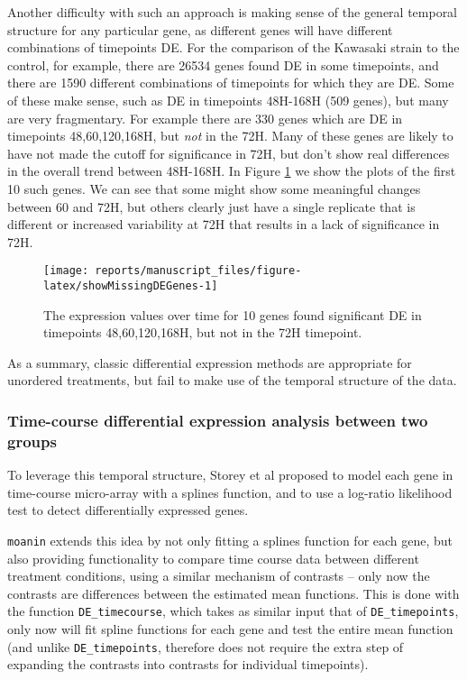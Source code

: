 \documentclass[9pt,a4paper,]{extarticle}
\begin{document}
Another difficulty with such an approach is making sense of the general
temporal structure for any particular gene, as different genes will have
different combinations of timepoints DE. For the comparison of the Kawasaki
strain to the control, for example, there are 26534 genes
found DE in some timepoints, and there are 1590 different
combinations of timepoints for which they are DE. Some of these make sense,
such as DE in timepoints 48H-168H (509 genes), but
many are very fragmentary. For example there are 330
genes which are DE in timepoints 48,60,120,168H, but \emph{not} in the 72H. Many of
these genes are likely to have not made the cutoff for significance in 72H,
but don't show real differences in the overall trend between 48H-168H. In Figure \ref{fig:showMissingDEGenes} we show the plots of the first 10 such genes. We can see that some might
show some meaningful changes between 60 and 72H, but others clearly just have
a single replicate that is different or increased variability at 72H that results in a lack of significance in 72H.

\begin{figure}[H]

{\centering \texttt{[image: reports/manuscript\_files/figure-latex/showMissingDEGenes-1]} 

}

\caption{The expression values over time for 10 genes found significant DE in timepoints 48,60,120,168H, but not in the 72H timepoint.}\label{fig:showMissingDEGenes}
\end{figure}

As a summary, classic differential expression methods are appropriate for
unordered treatments, but fail to make use of the temporal structure of the data.

\hypertarget{time-course-differential-expression-analysis-between-two-groups}{%
\subsubsection{Time-course differential expression analysis between two groups}\label{time-course-differential-expression-analysis-between-two-groups}}

To leverage this temporal structure, Storey et al \citep{storey:significance}
proposed to model each gene in time-course micro-array with a splines
function, and to use a log-ratio likelihood test to detect differentially
expressed genes.

\texttt{moanin} extends this idea by not only fitting a splines function for each gene, but also providing functionality to compare time course
data between different treatment conditions, using a similar mechanism of
contrasts -- only now the contrasts are differences between the estimated mean
functions. This is done with the function \texttt{DE\_timecourse}, which takes as
similar input that of \texttt{DE\_timepoints}, only now will fit spline functions for each gene and test the entire mean
function (and unlike \texttt{DE\_timepoints}, therefore does not require the extra step of expanding the contrasts into contrasts for individual timepoints).
\end{document}
